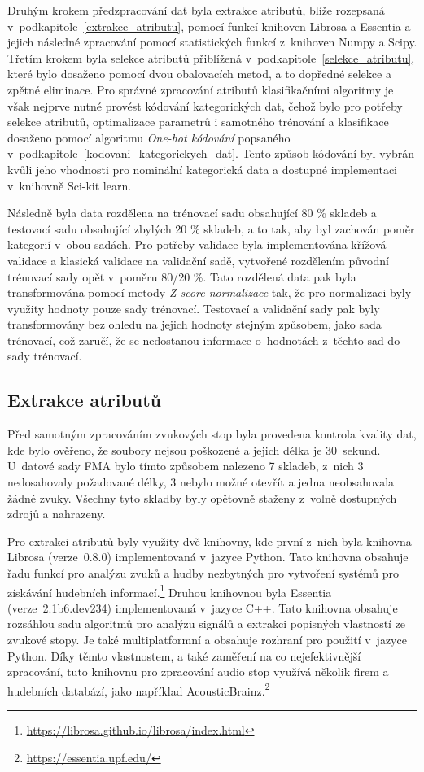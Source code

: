 Druhým krokem předzpracování dat byla extrakce atributů, blíže rozepsaná v~podkapitole~\ref{extrakce_atributu}, pomocí funkcí knihoven Librosa a Essentia a jejich následné zpracování pomocí statistických funkcí z~knihoven Numpy a Scipy. Třetím krokem byla selekce atributů přiblížená v~podkapitole~\ref{selekce_atributu}, které bylo dosaženo pomocí dvou obalovacích metod, a to dopředné selekce a zpětné eliminace. Pro správné zpracování atributů klasifikačními algoritmy je však nejprve nutné provést kódování kategorických dat, čehož bylo pro potřeby selekce atributů, optimalizace parametrů i samotného trénování a klasifikace dosaženo pomocí algoritmu \textit{One-hot kódování} popsaného v~podkapitole~\ref{kodovani_kategorickych_dat}. Tento způsob kódování byl vybrán kvůli jeho vhodnosti pro nominální kategorická data a dostupné implementaci v~knihovně Sci-kit learn.

Následně byla data rozdělena na trénovací sadu obsahující 80 \% skladeb a testovací sadu obsahující zbylých 20 \% skladeb, a to tak, aby byl zachován poměr kategorií v~obou sadách. Pro potřeby validace byla implementována křížová validace a klasická validace na validační sadě, vytvořené rozdělením původní trénovací sady opět v~poměru 80/20 \%. Tato rozdělená data pak byla transformována pomocí metody \textit{Z-score normalizace} tak, že pro normalizaci byly využity hodnoty pouze sady trénovací. Testovací a validační sady pak byly transformovány bez ohledu na jejich hodnoty stejným způsobem, jako sada trénovací, což zaručí, že se nedostanou informace o~hodnotách z~těchto sad do sady trénovací. 

\subsection*{Extrakce atributů}
\label{NIS_extrakce_atributu}
Před samotným zpracováním zvukových stop byla provedena kontrola kvality dat, kde bylo ověřeno, že soubory nejsou poškozené a jejich délka je 30~sekund. U~datové sady FMA bylo tímto způsobem nalezeno 7 skladeb, z~nich 3 nedosahovaly požadované délky, 3 nebylo možné otevřít a jedna neobsahovala žádné zvuky. Všechny tyto skladby byly opětovně staženy z~volně dostupných zdrojů a nahrazeny.

Pro extrakci atributů byly využity dvě knihovny, kde první z~nich byla knihovna Librosa (verze~0.8.0) implementovaná v~jazyce Python. Tato knihovna obsahuje řadu funkcí pro analýzu zvuků a hudby nezbytných pro vytvoření systémů pro získávání hudebních informací.\footnote{\url{https://librosa.github.io/librosa/index.html}} Druhou knihovnou byla Essentia (verze~2.1b6.dev234) implementovaná v~jazyce C++. Tato knihovna obsahuje rozsáhlou sadu algoritmů pro analýzu signálů a extrakci popisných vlastností ze zvukové stopy. Je také multiplatformní a obsahuje rozhraní pro použití v~jazyce Python. Díky těmto vlastnostem, a také zaměření na co nejefektivnější zpracování, tuto knihovnu pro zpracování audio stop využívá několik firem a hudebních databází, jako například AcousticBrainz.\footnote{\url{https://essentia.upf.edu/}}

